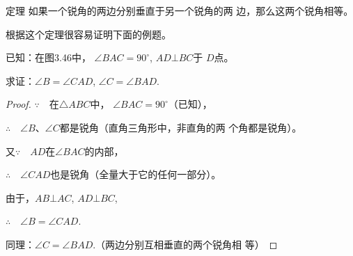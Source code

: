 \begin{blk}
   {定理} 如果一个锐角的两边分别垂直于另一个锐角的两
边，那么这两个锐角相等。 
\end{blk}

根据这个定理很容易证明下面的例题。

\begin{example}
已知：在图3.46中，
$\angle BAC=90^{\circ}$, $AD\bot BC$于
$D$点。

求证：$\angle B=\angle CAD$, $\angle C=\angle BAD$.
\end{example}


\begin{proof}
$\because\quad $在$\triangle ABC$中，
$\angle BAC=90^{\circ}$（已知），

$\therefore\quad \angle B$、$\angle C$都是锐角（直角三角形中，非直角的两
个角都是锐角）。

又$\because\quad AD$在$\angle BAC$的内部，

$\therefore\quad \angle CAD$也是锐角（全量大于它的任何一部分）。

由于，$AB\bot AC$, $AD\bot BC$, 

$\therefore\quad \angle B=\angle CAD$.

同理：$\angle C=\angle BAD$.（两边分别互相垂直的两个锐角相
等）
\end{proof}

\begin{figure}[htp]\centering
    \begin{minipage}[t]{0.48\textwidth}
    \centering
{}
    \caption{}
    \end{minipage}
    \begin{minipage}[t]{0.48\textwidth}
    \centering
    \caption{}
    \end{minipage}
    \end{figure}


